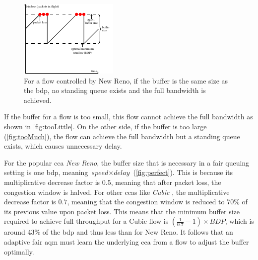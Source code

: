 \documentclass[10pt,sigconf,letterpaper,anonymous]{acmart}
\begin{document}
\begin{figure}[h]
\includegraphics[width=\columnwidth]{figures/cocoa_illustration_perfect.pdf}
\caption{For a flow controlled by New Reno, if the buffer is the same size as the \gls{bdp}, no standing queue exists and the full bandwidth is achieved.}
\label{fig:perfect}
\end{figure}

If the buffer for a flow is too small, this flow cannot achieve the full bandwidth as shown in \autoref{fig:tooLittle}. On the other side, if the buffer is too large (\autoref{fig:tooMuch}), the flow can achieve the full bandwidth but a standing queue exists, which causes unnecessary delay.  

For the popular \gls{cca} \textit{New Reno}, the buffer size that is necessary in a fair queuing setting is one \gls{bdp}, meaning $\textit{speed}\times\textit{delay}$ (\autoref{fig:perfect}). This is because its multiplicative decrease factor is $0.5$, meaning that after packet loss, the congestion window is halved. For other \glspl{cca} like \textit{Cubic} \cite{ha_cubic:_2008}, the multiplicative decrease factor is $0.7$, meaning that the congestion window is reduced to 70\% of its previous value upon packet loss. This means that the minimum buffer size required to achieve full throughput for a Cubic flow is $\left(\frac{1}{0.7}-1\right)\times \textit{BDP}$, which is around 43\% of the \gls{bdp} and thus less than for New Reno. It follows that an adaptive fair \gls{aqm} must learn the underlying \gls{cca} from a flow to adjust the buffer optimally. 
\end{document}
